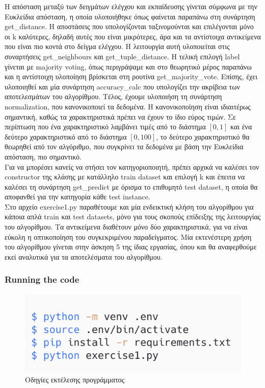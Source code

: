 \documentclass[12pt]{article}
\newenvironment{matlab}
	{\begin{figure}[H]\centering\captionsetup{justification=centering}}
	{\end{figure}}
\begin{document}
Η απόσταση μεταξύ των δειγμάτων ελέγχου και εκπαίδευσης γίνεται σύμφωνα με την Ευκλείδια απόσταση, η οποία υλοποιήθηκε όπως φαίνεται παραπάνω στη συνάρτηση get\_distance. Η αποστάσεις που υπολογίζονται ταξινομούνται και επιλέγονται μόνο οι k καλύτερες, δηλαδή αυτές που είναι μικρότερες, άρα και τα αντίστοιχα αντικείμενα που είναι πιο κοντά στο δείγμα ελέγχου. Η λειτουργία αυτή υλοποιείται στις συναρτήσεις get\_neighbours και get\_tuple\_distance. Η τελική επιλογή label γίνεται με majority voting, όπως περιγράψαμε και στο θεωρητικό μέρος παραπάνω και η αντίστοιχη υλοποίηση βρίσκεται στη ρουτίνα get\_majority\_vote. Επίσης, έχει υλοποιηθεί και μία συνάρτηση accuracy\_calc που υπολογίζει την ακρίβεια των αποτελεσμάτων του αλγορίθμου. Τέλος, έχουμε υλοποιήση τη συνάρτηση normalization, που κανονικοποιεί τα δεδομένα. Η κανονικοποίηση είναι ιδιαιτέρως σημαντική, καθώς τα χαρακτηριστικά πρέπει να έχουν το ίδιο εύρος τιμών. Σε περίπτωση που ένα χαρακτηριστικό λαμβάνει τιμές από το διάστημα \([0,1]\) και ένα δεύτερο χαρακτηριστικό από το διάστημα \([0,100]\), το δεύτερο χαρακτηριστικό θα θεωρηθεί από τον αλγόριθμο, που συγκρίνει τα δεδομένα με βάση την Ευκλείδια απόσταση, πιο σημαντικό. \\

Για να μπορέσει κανείς να στήσει τον κατηγοριοποιητή, πρέπει αρχικά να καλέσει τον constructor της κλάσης με κατάλληλο train dataset και επιλογή k και έπειτα να καλέσει τη συνάρτηση get\_predict με όρισμα το επιθυμητό test dataset, η οποία θα αποφανθεί για την κατηγορία κάθε test instance. \\

Στο αρχείο exercise1.py παραθέτουμε και μία ενδεικτική κλήση του αλγορίθμου για κάποια απλά train και test datasets, μόνο για τους σκοπούς επίδειξης της λειτουργίας του αλγορίθμου. Τα αντικείμενα διαθέτουν μόνο δύο χαρακτηριστικά, για να είναι εύκολη η οπτικοποίηση του συγκεκριμένου παραδείγματος. Μία εκτενέστερη χρήση του αλγορίθμου γίνεται στην άσκηση 5 της ίδιας εργασίας, όπου και θα αναφερθούμε εκεί αναλυτικά για τα αποτελέσματα του αλγορίθμου. \\

\subsubsection*{Running the code}

\begin{matlab}
	\includegraphics[scale=0.3]{images/exercise1_run.png}
	\caption{Οδηγίες εκτέλεσης προγράμματος}
\end{matlab}
\end{document}
